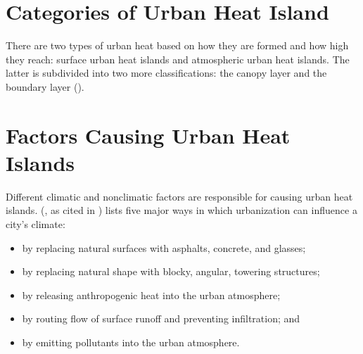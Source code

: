 \section{Categories of Urban Heat Island}

There are two types of urban heat based on how they are formed and how high they reach:
surface urban heat islands and atmospheric urban heat islands.
The latter is subdivided into two more classifications:
the canopy layer and the boundary layer (\cite{Zhou2018}).

\section{Factors Causing Urban Heat Islands}

Different climatic and nonclimatic factors are responsible for causing urban heat islands.
\citeauthor{Bridgman1995} (\citeyear{Bridgman1995}, as cited in \cite{Khan2021}) lists five major ways in which urbanization can influence a city's climate:
\begin{itemize}
	\item by replacing natural surfaces with asphalts, concrete, and glasses;
	\item by replacing natural shape with blocky, angular, towering structures;
	\item by releasing anthropogenic heat into the urban atmosphere;
	\item by routing flow of surface runoff and preventing infiltration; and
	\item by emitting pollutants into the urban atmosphere.
\end{itemize}
